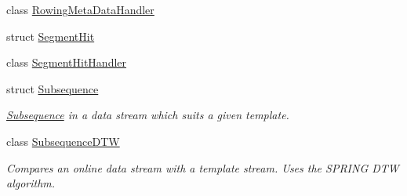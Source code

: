\begin{DoxyCompactItemize}
class \hyperlink{class_rowing_monitor_1_1_model_1_1_util_1_1_rowing_meta_data_handler}{Rowing\+Meta\+Data\+Handler}
\item 
struct \hyperlink{struct_rowing_monitor_1_1_model_1_1_util_1_1_segment_hit}{Segment\+Hit}
\item 
class \hyperlink{class_rowing_monitor_1_1_model_1_1_util_1_1_segment_hit_handler}{Segment\+Hit\+Handler}
\item 
struct \hyperlink{struct_rowing_monitor_1_1_model_1_1_util_1_1_subsequence}{Subsequence}
\begin{DoxyCompactList}\small\item\em \hyperlink{struct_rowing_monitor_1_1_model_1_1_util_1_1_subsequence}{Subsequence} in a data stream which suits a given template. \end{DoxyCompactList}\item 
class \hyperlink{class_rowing_monitor_1_1_model_1_1_util_1_1_subsequence_d_t_w}{Subsequence\+D\+TW}
\begin{DoxyCompactList}\small\item\em Compares an online data stream with a template stream. Uses the S\+P\+R\+I\+NG D\+TW algorithm. \end{DoxyCompactList}\end{DoxyCompactItemize}
